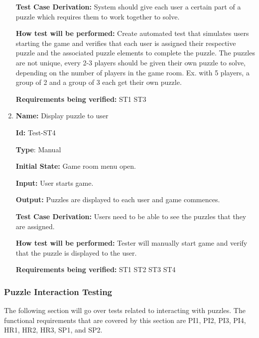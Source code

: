 \documentclass[12pt, titlepage]{article}
\begin{document}
\begin{enumerate}
\textbf{Test Case Derivation:} System should give each user a certain part of a puzzle which requires them to work together to solve.

\textbf{How test will be performed:} Create automated test that simulates users starting the game and verifies that each user is assigned their respective puzzle and the associated puzzle elements to complete the puzzle. The puzzles are not unique, every 2-3 players should be given their own puzzle to solve, depending on the number of players in the game room. Ex. with 5 players, a group of 2 and a group of 3 each get their own puzzle. 

\textbf{Requirements being verified: } ST1 ST3

\item{\textbf{Name:} Display puzzle to user} \label{itm:Test-ST5}

\textbf{Id:} Test-ST4

\textbf{Type}: Manual

\textbf{Initial State:} Game room menu open.

\textbf{Input:} User starts game.

\textbf{Output:} Puzzles are displayed to each user and game commences.

\textbf{Test Case Derivation:} Users need to be able to see the puzzles that they are assigned.

\textbf{How test will be performed:} Tester will manually start game and verify that the puzzle is displayed to the user.

\textbf{Requirements being verified: } ST1 ST2 ST3 ST4

\end{enumerate}

\subsubsection{Puzzle Interaction Testing}
The following section will go over tests related to interacting with puzzles. The functional requirements that are covered by this section are PI1, PI2, PI3, PI4, HR1, HR2, HR3, SP1, and SP2.
\end{document}
